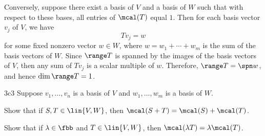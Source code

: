 \begin{sol}
    Conversely, suppose there exist a basis of $V$ and a basis of $W$ such that with respect to these bases, all entries of $\mcal(T)$ equal $1$.
	Then for each basis vector $v_j$ of $V$, we have
    \[
    	Tv_j = w
    \]
    for some fixed nonzero vector $w \in W$, where $w = w_1 + \cdots + w_m$ is the sum of the basis vectors of $W$.
	Since $\range T$ is spanned by the images of the basis vectors of $V$, then any sum of $Tv_j$ is a scalar multiple of $w$.
	Therefore, $\range T = \spn w$, and hence $\dim \range T = 1$.
\end{sol}

\begin{exercise}{3c3}
    Suppose $v_1, \ldots, v_n$ is a basis of $V$ and $w_1, \ldots, w_m$ is a basis of $W$.
    \begin{subexercises}
        \item Show that if $S, T \in \lin{V, W}$, then $\mcal(S + T) = \mcal(S) + \mcal(T)$.
        \item Show that if $\lambda \in \fbb$ and $T \in \lin{V, W}$, then $\mcal(\lambda T) = \lambda \mcal(T)$.
    \end{subexercises}
\end{exercise}

